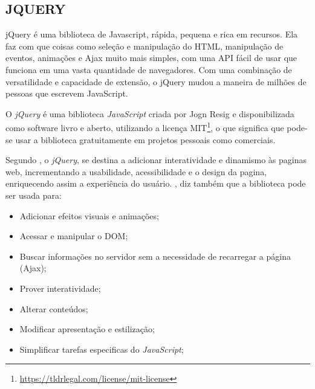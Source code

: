 \subsection{JQUERY}

\begin{citacao}
    jQuery é uma biblioteca de Javascript, rápida, pequena e rica em recursos. Ela faz com que coisas como seleção e manipulação do HTML, manipulação de eventos, animações e Ajax muito mais simples, com uma API fácil de usar que funciona em uma vasta quantidade de navegadores. Com uma combinação de versatilidade e capacidade de extensão, o jQuery mudou a maneira de milhões de pessoas que escrevem JavaScript. \cite[tradução nossa]{jquery}
\end{citacao}

O \textit{jQuery} é uma biblioteca \textit{JavaScript} criada por Jogn Resig e disponibilizada como software livro e aberto, utilizando a licença \ac{MIT}\footnote{\url{https://tldrlegal.com/license/mit-license}}, o que significa que pode-se usar a biblioteca gratuitamente em projetos pessoais como comerciais.

Segundo \cite[p.~4]{silva-jquery}, o \textit{jQuery}, se destina a adicionar interatividade e dinamismo às paginas web, incrementando a usabilidade, acessibilidade e o design da pagina, enriquecendo assim a experiência do usuário. , diz também que a biblioteca pode ser usada para:
\begin{itemize}
    \item Adicionar efeitos visuais e animações;
    \item Acessar e manipular o DOM;
    \item Buscar informações no servidor sem a necessidade de recarregar a página (Ajax);
    \item Prover interatividade;
    \item Alterar conteúdos;
    \item Modificar apresentação e estilização;
    \item Simplificar tarefas especificas do \textit{JavaScript};
\end{itemize}


